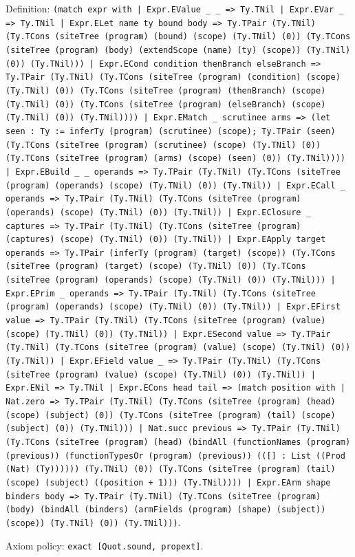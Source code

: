 \documentclass[11pt]{article}
\begin{document}
\noindent Definition: \texttt{(match expr with | Expr.EValue \_ \_ => Ty.TNil | Expr.EVar \_ => Ty.TNil | Expr.ELet name ty bound body => Ty.TPair (Ty.TNil) (Ty.TCons (siteTree (program) (bound) (scope) (Ty.TNil) (0)) (Ty.TCons (siteTree (program) (body) (extendScope (name) (ty) (scope)) (Ty.TNil) (0)) (Ty.TNil))) | Expr.ECond condition thenBranch elseBranch => Ty.TPair (Ty.TNil) (Ty.TCons (siteTree (program) (condition) (scope) (Ty.TNil) (0)) (Ty.TCons (siteTree (program) (thenBranch) (scope) (Ty.TNil) (0)) (Ty.TCons (siteTree (program) (elseBranch) (scope) (Ty.TNil) (0)) (Ty.TNil)))) | Expr.EMatch \_ scrutinee arms => (let seen : Ty := inferTy (program) (scrutinee) (scope); Ty.TPair (seen) (Ty.TCons (siteTree (program) (scrutinee) (scope) (Ty.TNil) (0)) (Ty.TCons (siteTree (program) (arms) (scope) (seen) (0)) (Ty.TNil)))) | Expr.EBuild \_ \_ operands => Ty.TPair (Ty.TNil) (Ty.TCons (siteTree (program) (operands) (scope) (Ty.TNil) (0)) (Ty.TNil)) | Expr.ECall \_ operands => Ty.TPair (Ty.TNil) (Ty.TCons (siteTree (program) (operands) (scope) (Ty.TNil) (0)) (Ty.TNil)) | Expr.EClosure \_ captures => Ty.TPair (Ty.TNil) (Ty.TCons (siteTree (program) (captures) (scope) (Ty.TNil) (0)) (Ty.TNil)) | Expr.EApply target operands => Ty.TPair (inferTy (program) (target) (scope)) (Ty.TCons (siteTree (program) (target) (scope) (Ty.TNil) (0)) (Ty.TCons (siteTree (program) (operands) (scope) (Ty.TNil) (0)) (Ty.TNil))) | Expr.EPrim \_ operands => Ty.TPair (Ty.TNil) (Ty.TCons (siteTree (program) (operands) (scope) (Ty.TNil) (0)) (Ty.TNil)) | Expr.EFirst value => Ty.TPair (Ty.TNil) (Ty.TCons (siteTree (program) (value) (scope) (Ty.TNil) (0)) (Ty.TNil)) | Expr.ESecond value => Ty.TPair (Ty.TNil) (Ty.TCons (siteTree (program) (value) (scope) (Ty.TNil) (0)) (Ty.TNil)) | Expr.EField value \_ => Ty.TPair (Ty.TNil) (Ty.TCons (siteTree (program) (value) (scope) (Ty.TNil) (0)) (Ty.TNil)) | Expr.ENil => Ty.TNil | Expr.ECons head tail => (match position with | Nat.zero => Ty.TPair (Ty.TNil) (Ty.TCons (siteTree (program) (head) (scope) (subject) (0)) (Ty.TCons (siteTree (program) (tail) (scope) (subject) (0)) (Ty.TNil))) | Nat.succ previous => Ty.TPair (Ty.TNil) (Ty.TCons (siteTree (program) (head) (bindAll (functionNames (program) (previous)) (functionTypesOr (program) (previous)) (([] : List ((Prod (Nat) (Ty)))))) (Ty.TNil) (0)) (Ty.TCons (siteTree (program) (tail) (scope) (subject) ((position + 1))) (Ty.TNil)))) | Expr.EArm shape binders body => Ty.TPair (Ty.TNil) (Ty.TCons (siteTree (program) (body) (bindAll (binders) (armFields (program) (shape) (subject)) (scope)) (Ty.TNil) (0)) (Ty.TNil)))}.\par
\noindent Axiom policy: \texttt{exact [Quot.sound, propext]}.\par
\end{document}

